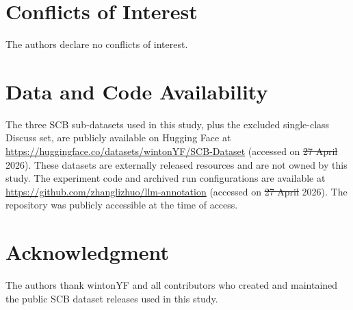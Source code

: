 \documentclass{ieeeaccess}
\providecommand{\DIFadd}[1]{{\protect\color{blue}\uwave{#1}}} %
\providecommand{\DIFdel}[1]{{\protect\color{red}\sout{#1}}}                      %
\providecommand{\DIFaddbegin}{} %
\providecommand{\DIFaddend}{} %
\providecommand{\DIFdelbegin}{} %
\providecommand{\DIFdelend}{} %
\newcommand{\DIFscaledelfig}{0.5}
\newlength{\DIFdelgraphicswidth} %
\newlength{\DIFdelgraphicsheight} %
\newcommand{\DIFaddincludegraphics}[2][]{{\color{blue}\fbox{\DIFOincludegraphics[#1]{#2}}}} %
\newcommand{\DIFdelincludegraphics}[2][]{%
\sbox{\DIFdelgraphicsbox}{\DIFOincludegraphics[#1]{#2}}%
\settoboxwidth{\DIFdelgraphicswidth}{\DIFdelgraphicsbox} %
\settoboxtotalheight{\DIFdelgraphicsheight}{\DIFdelgraphicsbox} %
\scalebox{\DIFscaledelfig}{%
\parbox[b]{\DIFdelgraphicswidth}{\usebox{\DIFdelgraphicsbox}\\[-\baselineskip] \rule{\DIFdelgraphicswidth}{0em}}\llap{\resizebox{\DIFdelgraphicswidth}{\DIFdelgraphicsheight}{%
\setlength{\unitlength}{\DIFdelgraphicswidth}%
\begin{picture}(1,1)%
\thicklines\linethickness{2pt} %
{\color[rgb]{1,0,0}\put(0,0){\framebox(1,1){}}}%
{\color[rgb]{1,0,0}\put(0,0){\line( 1,1){1}}}%
{\color[rgb]{1,0,0}\put(0,1){\line(1,-1){1}}}%
\end{picture}%
}\hspace*{3pt}}} %
} %
\DeclareRobustCommand{\DIFaddbegin}{\DIFOaddbegin \let\includegraphics\DIFaddincludegraphics} %
\DeclareRobustCommand{\DIFaddend}{\DIFOaddend \let\includegraphics\DIFOincludegraphics} %
\DeclareRobustCommand{\DIFdelbegin}{\DIFOdelbegin \let\includegraphics\DIFdelincludegraphics} %
\DeclareRobustCommand{\DIFdelend}{\DIFOaddend \let\includegraphics\DIFOincludegraphics} %
\begin{document}
\section*{Conflicts of Interest}
The authors declare no conflicts of interest.

\section*{Data and Code Availability}
The three SCB sub-datasets used in this study, plus the excluded
single-class Discuss set, are publicly available on Hugging Face at
\url{https://huggingface.co/datasets/wintonYF/SCB-Dataset} (accessed on
\DIFdelbegin \DIFdel{27 April }\DIFdelend \DIFaddbegin \DIFadd{25 June }\DIFaddend 2026). These datasets are externally released resources and are
not owned by this study. The experiment code and archived run
configurations are available at
\url{https://github.com/zhanglizhuo/llm-annotation} (accessed on \DIFdelbegin \DIFdel{27 April }\DIFdelend \DIFaddbegin \DIFadd{25 June }\DIFaddend 2026).
The repository was publicly accessible at the time of access.

\section*{Acknowledgment}
The authors thank wintonYF and all contributors who created and maintained
the public SCB dataset releases used in this study.
\end{document}
